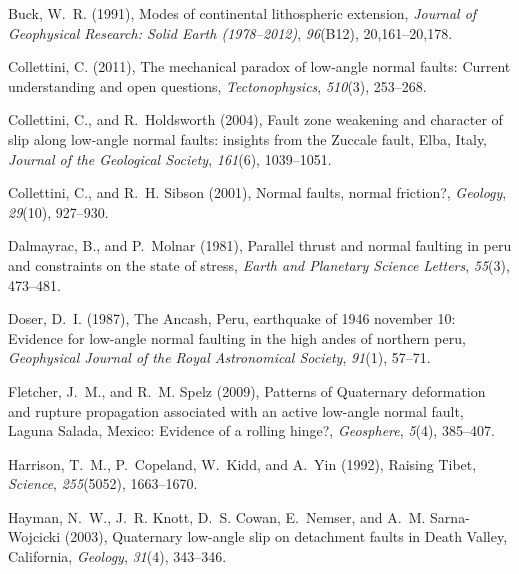 \documentclass[draft,grl]{AGUTeX}
\begin{document}
\begin{article}
\begin{thebibliography}{46}
Buck, W.~R. (1991), Modes of continental lithospheric extension,
  \textit{Journal of Geophysical Research: Solid Earth (1978--2012)},
  \textit{96}(B12), 20,161--20,178.

Collettini, C. (2011), The mechanical paradox of low-angle normal faults:
  Current understanding and open questions, \textit{Tectonophysics},
  \textit{510}(3), 253--268.

Collettini, C., and R.~Holdsworth (2004), Fault zone weakening and character of
  slip along low-angle normal faults: insights from the {Z}uccale fault,
  {E}lba, {I}taly, \textit{Journal of the Geological Society}, \textit{161}(6),
  1039--1051.

Collettini, C., and R.~H. Sibson (2001), Normal faults, normal friction?,
  \textit{Geology}, \textit{29}(10), 927--930.

Dalmayrac, B., and P.~Molnar (1981), Parallel thrust and normal faulting in
  peru and constraints on the state of stress, \textit{Earth and Planetary
  Science Letters}, \textit{55}(3), 473--481.

Doser, D.~I. (1987), The {A}ncash, {P}eru, earthquake of 1946 november 10:
  Evidence for low-angle normal faulting in the high andes of northern peru,
  \textit{Geophysical Journal of the Royal Astronomical Society},
  \textit{91}(1), 57--71.

Fletcher, J.~M., and R.~M. Spelz (2009), Patterns of {Q}uaternary deformation
  and rupture propagation associated with an active low-angle normal fault,
  {L}aguna {S}alada, {M}exico: Evidence of a rolling hinge?,
  \textit{Geosphere}, \textit{5}(4), 385--407.

Harrison, T.~M., P.~Copeland, W.~Kidd, and A.~Yin (1992), Raising {Ti}bet,
  \textit{Science}, \textit{255}(5052), 1663--1670.

Hayman, N.~W., J.~R. Knott, D.~S. Cowan, E.~Nemser, and A.~M. Sarna-Wojcicki
  (2003), Quaternary low-angle slip on detachment faults in {D}eath {V}alley,
  {C}alifornia, \textit{Geology}, \textit{31}(4), 343--346.


\end{thebibliography}
\end{article}
\end{document}
